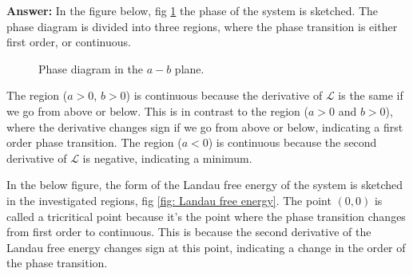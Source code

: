 \documentclass[a4paper]{article}
\newcommand{\newparagraph}{\vspace{.5cm}\noindent}
\begin{document}
\newparagraph
\textbf{Answer: }
In the figure below, fig \ref{fig: phase diagram} the phase of the system is sketched. The phase diagram is divided into three regions, where the phase transition is either first order, or continuous.
\begin{figure}[H]
    \centering
    \caption{Phase diagram in the $a-b$ plane.}
    \label{fig: phase diagram}
\end{figure}\noindent
The region ($a>0$, $b>0$) is continuous because the derivative of $\mathcal{L}$ is the same if we go from above or below. This is in contrast to the region ($a>0$ and $b> 0$), where the derivative changes sign if we go from above or below, indicating a first order phase transition.
The region ($a<0$) is continuous because the second derivative of $\mathcal{L}$ is negative, indicating a minimum.

\newparagraph
In the below figure, the form of the Landau free energy of the system is sketched in the investigated regions, fig \ref{fig: Landau free energy}.
The point $(0,0)$ is called a tricritical point because it's the point where the phase transition changes from first order to continuous. This is because the second derivative of the Landau free energy changes sign at this point, indicating a change in the order of the phase transition.
\end{document}
